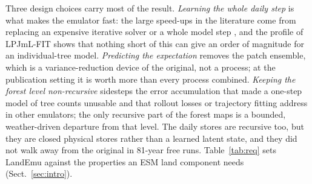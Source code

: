 \documentclass[11pt,a4paper]{article}
\begin{document}
Three design choices carry most of the result. \emph{Learning the whole daily step} is what makes the emulator fast:
the large speed-ups in the literature come from replacing an expensive iterative solver or a whole model step
\citep{R00067,R02497,R00568}, and the profile of LPJmL-FIT shows that nothing short of this can give an order of
magnitude for an individual-tree model. \emph{Predicting the expectation} removes the patch ensemble, which is a
variance-reduction device of the original, not a process; at the publication setting it is worth more than every
process combined. \emph{Keeping the forest level non-recursive} sidesteps the error accumulation that made a one-step
model of tree counts unusable and that rollout losses \citep{R00593,R01133} or trajectory fitting \citep{R00661}
address in other emulators; the only recursive part of the forest maps is a bounded, weather-driven departure from
that level. The daily stores are recursive too, but they are closed physical stores rather than a learned latent
state, and they did not walk away from the original in 81-year free runs. Table~\ref{tab:req} sets LandEmu against
the properties an ESM land component needs (Sect.~\ref{sec:intro}).
\end{document}
